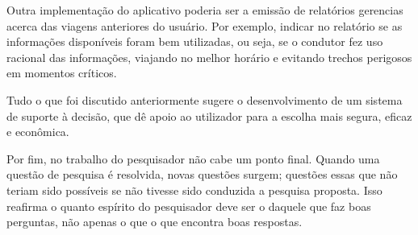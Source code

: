 Outra implementação do aplicativo poderia ser a emissão de relatórios gerencias acerca das viagens anteriores do usuário. Por exemplo, indicar no relatório se as informações disponíveis foram bem utilizadas, ou seja, se o condutor fez uso racional das informações, viajando no melhor horário e evitando trechos perigosos em momentos críticos.

Tudo o que foi discutido anteriormente sugere o desenvolvimento de um sistema de suporte à decisão, que dê apoio ao utilizador para a escolha mais segura, eficaz e econômica. 

Por fim, no trabalho do pesquisador não cabe um ponto final. Quando uma questão de pesquisa é resolvida, novas questões surgem; questões essas que não teriam sido possíveis se não tivesse sido conduzida a pesquisa proposta. Isso reafirma o quanto espírito do pesquisador deve ser o daquele que faz boas perguntas, não apenas o que o que encontra boas respostas. 




